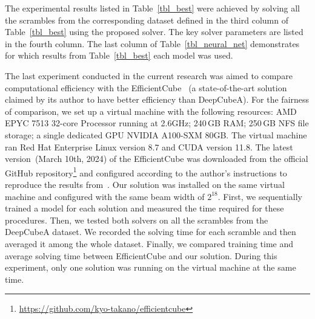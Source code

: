 The experimental results listed in Table~\ref{tbl_best} were achieved by solving all the scrambles from the corresponding dataset defined in the third column of Table~\ref{tbl_best} using the proposed solver. The key solver parameters are listed in the fourth column. The last column of Table~\ref{tbl_neural_net} demonstrates for which results from Table~\ref{tbl_best} each model was used.

The last experiment conducted in the current research was aimed to compare computational efficiency with the EfficientCube~\cite{takano2023selfsupervision} (a state-of-the-art solution claimed by its author to have better efficiency than DeepCubeA). For the fairness of comparison, we set up a virtual machine with the following resources: AMD EPYC 7513 32-core Processor running at 2.6GHz; 240\,GB RAM; 250\,GB NFS file storage; a single dedicated GPU NVIDIA A100-SXM 80GB. The virtual machine ran Red Hat Enterprise Linux version 8.7 and CUDA version 11.8. The latest version~(March 10th, 2024) of the EfficientCube was downloaded from the official GitHub repository\footnote{\url{https://github.com/kyo-takano/efficientcube}} and configured according to the author's instructions to reproduce the results from~\cite{takano2023selfsupervision}. Our solution was installed on the same virtual machine and configured with the same beam width of $2^{18}$. First, we sequentially trained a model for each solution and measured the time required for these procedures. Then, we tested both solvers on all the scrambles from the DeepCubeA dataset. We recorded the solving time for each scramble and then averaged it among the whole dataset. Finally, we compared training time and average solving time between EfficientCube and our solution. During this experiment, only one solution was running on the virtual machine at the same time.